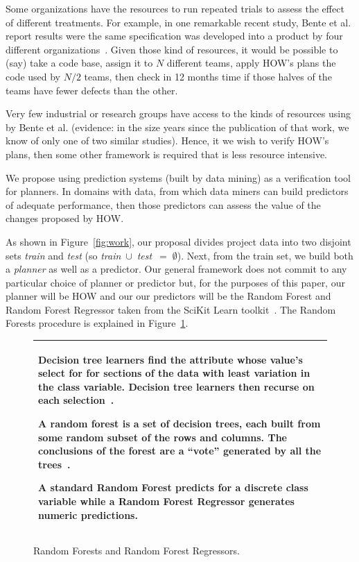 \documentclass[conference]{IEEEtran}
\newcommand{\fig}[1]{Figure~\ref{fig:#1}}
\begin{document}
Some organizations have the resources to 
run repeated trials to assess the effect of different treatments.
For example, in one remarkable recent study, Bente et al. report results
were the same specification was developed into a product by four different organizations~\cite{Anda2009}. Given those kind of resources, it would be possible
to (say) take a code base, assign it to $N$ different teams, apply
HOW's plans the code used by  $N/2$ teams, then check in 12 months time
if those halves of the teams have fewer defects than the other.  

Very few industrial or research groups have access
to the kinds of resources using by Bente et al. (evidence: in the size years since the
publication of that work, we know of only one of two similar studies). Hence, it
we wish to verify HOW's plans, then some other framework is required that is less
resource intensive.
 




We propose using prediction systems (built by data mining) as a verification
tool for planners. In domains with data, from which data miners can build
predictors of adequate performance, then those predictors can assess the value
of the changes proposed by HOW.

As shown in \fig{work}, our proposal divides
project data  into two disjoint sets {\em train} and {\em test}
(so \mbox{{\em train} $\cup$ {\em test} $=\;\emptyset$}).
Next, from the train set, we build both a {\em planner} as well
as a {  predictor}. Our general framework does not   commit to any particular  choice
of { planner} or { predictor} but, for the purposes of this paper, 
our { planner}
will be HOW  and our
our { predictors} will be the Random Forest and Random Forest
Regressor taken from the SciKit
Learn toolkit~\cite{Pedregosa2012}. The Random Forests procedure is explained in \fig{rr}. 

\begin{figure}[t!]
\small
\begin{tabular}{|p{.95\linewidth}|}\hline
 Decision tree learners find the attribute whose value's
select for for sections of the data with least variation in the class
variable. Decision tree learners then recurse on each selection~\cite{breiman84}. 

A random forest is a set of decision trees, each built
from some random subset of the rows and columns. The conclusions
of the forest are a ``vote'' generated by all the trees~\cite{Breiman2001}. 

A standard Random Forest predicts for a discrete class variable while
a Random Forest Regressor generates numeric predictions.\\\hline
\end{tabular}
\caption{Random Forests and Random Forest Regressors.}\label{fig:rr}
\end{figure}
\end{document}
